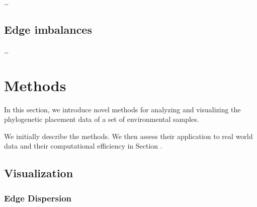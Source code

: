 \documentclass[10pt,letterpaper]{article}
\begin{document}
\ldots


\subsection*{Edge imbalances}
\label{sec:Introduction:sub:Imbalances}

\ldots


\section*{Methods}
\label{sec:MaterialsMethods}

In this section, we introduce novel methods for analyzing and visualizing
the phylogenetic placement data of a set of environmental samples.

We initially describe the methods.
We then assess their application to real world data and their computational efficiency in Section .


\subsection*{Visualization}
\label{sec:MaterialsMethods:sub:Visualization}


\subsubsection*{Edge Dispersion}
\label{sec:MaterialsMethods:sub:Visualization:sub:Dispersion}
\end{document}
